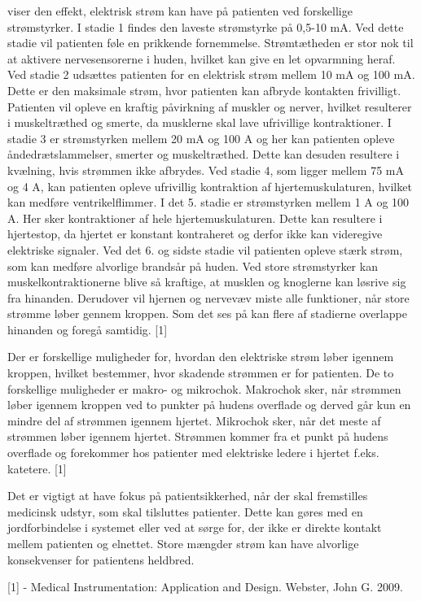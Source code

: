  viser den effekt, elektrisk strøm kan have på patienten ved forskellige strømstyrker. I stadie 1 findes den laveste strømstyrke på 0,5-10 mA. Ved dette stadie vil patienten føle en prikkende fornemmelse. Strømtætheden er stor nok til at aktivere nervesensorerne i huden, hvilket kan give en let opvarmning heraf. Ved stadie 2 udsættes patienten for en elektrisk strøm mellem 10 mA og 100 mA. Dette er den maksimale strøm, hvor patienten kan afbryde kontakten frivilligt. Patienten vil opleve en kraftig påvirkning af muskler og nerver, hvilket resulterer i muskeltræthed og smerte, da musklerne skal lave ufrivillige kontraktioner. I stadie 3 er strømstyrken mellem 20 mA og 100 A og her kan patienten opleve åndedrætslammelser, smerter og muskeltræthed. Dette kan desuden resultere i kvælning, hvis strømmen ikke afbrydes. Ved stadie 4, som ligger mellem 75 mA og 4 A, kan patienten opleve ufrivillig kontraktion af hjertemuskulaturen, hvilket kan medføre ventrikelflimmer. I det 5. stadie er strømstyrken mellem 1 A og 100 A. Her sker kontraktioner af hele hjertemuskulaturen. Dette kan resultere i hjertestop, da hjertet er konstant kontraheret og derfor ikke kan videregive elektriske signaler. Ved det 6. og sidste stadie vil patienten opleve stærk strøm, som kan medføre alvorlige brandsår på huden. Ved store strømstyrker kan muskelkontraktionerne blive så kraftige, at musklen og knoglerne kan løsrive sig fra hinanden. Derudover vil hjernen og nervevæv miste alle funktioner, når store strømme løber gennem kroppen. Som det ses på  kan flere af stadierne overlappe hinanden og foregå samtidig. [1]

Der er forskellige muligheder for, hvordan den elektriske strøm løber igennem kroppen, hvilket bestemmer, hvor skadende strømmen er for patienten. De to forskellige muligheder er makro- og mikrochok. Makrochok sker, når strømmen løber igennem kroppen ved to punkter på hudens overflade og derved går kun en mindre del af strømmen igennem hjertet. Mikrochok sker, når det meste af strømmen løber igennem hjertet. Strømmen kommer fra et punkt på hudens overflade og forekommer hos patienter med elektriske ledere i hjertet f.eks. katetere. [1]

Det er vigtigt at have fokus på patientsikkerhed, når der skal fremstilles medicinsk udstyr, som skal tilsluttes patienter. Dette kan gøres med en jordforbindelse i systemet eller ved at sørge for, der ikke er direkte kontakt mellem patienten og elnettet. Store mængder strøm kan have alvorlige konsekvenser for patientens heldbred. 


[1] - Medical Instrumentation: Application and Design. Webster, John G. 2009.
